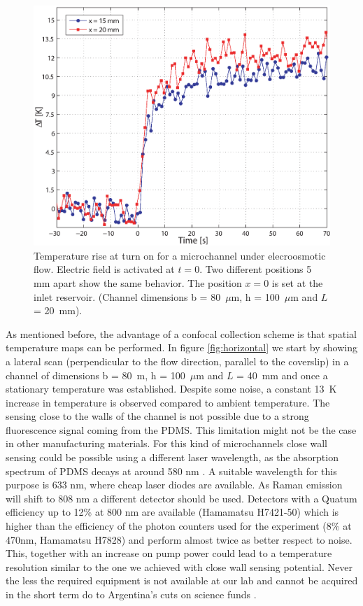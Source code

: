 \documentclass[9pt,twocolumn,twoside]{osajnl}
\begin{document}
\begin{figure}[htbp]
\centering
\includegraphics[width=\columnwidth]{figs/fig4.eps}
\caption{Temperature rise at turn on for a microchannel under elecroosmotic flow. Electric field is activated at $t=0$. Two different positions 5 mm apart show the same behavior. The position $x=0$ is set at the inlet reservoir. (Channel dimensions  b = 80~$\mu\mathrm{m}$, h = 100~$\mu\mathrm{m}$ and $L$ = 20~mm).\label{fig:temporal}}
\end{figure}

As mentioned before, the advantage of a confocal collection scheme is that spatial temperature maps can be performed. In figure \ref{fig:horizontal} we start by showing a lateral scan (perpendicular to the flow direction, parallel to the coverslip) in a channel of dimensions b = 80~$\mathrm{m}$, h = 100~$\mu\mathrm{m}$ and $L$ = 40~mm and once a stationary temperature was established. Despite some noise, a constant 13~K increase in temperature is observed compared to ambient temperature. The sensing close to the walls of the channel is not possible due to a strong fluorescence signal coming from the PDMS. This limitation might not be the case in other manufacturing materials. For this kind of microchannels close wall sensing could be possible using a different laser wavelength, as the absorption spectrum of PDMS decays at around 580 nm \cite{fluorPDMS}. A suitable wavelength for this purpose is 633 nm, where cheap laser diodes are available. As Raman emission will shift to 808 nm a different detector should be used. Detectors with a Quatum efficiency up to 12\% at 800 nm are available (Hamamatsu H7421-50) which is higher than the efficiency of the photon counters used for the experiment (8\% at 470nm, Hamamatsu H7828) and perform almost twice as better respect to noise. This, together with an increase on pump power could lead to a temperature resolution similar to the one we achieved with close wall sensing potential. Never the less the required equipment is not available at our lab and cannot be acquired in the short term do to Argentina's cuts on science funds \cite{arg1,arg2}.
\end{document}
